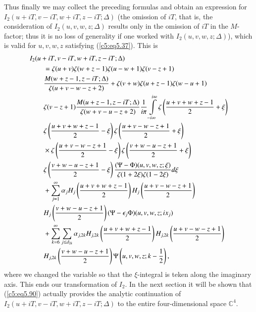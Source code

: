 Thus finally we may collect the preceding formulas and obtain an
expression for $I_2 (u+iT, v - iT, w + iT, z - iT;\Delta)$ (the
omission of $iT$, that is, the consideration of $I_2 (u,v,w,z;\Delta)$
results only in the omission of $iT$ in the $M$-factor; thus it is no
loss of generality if one worked with $I_2 (u,v,w,z;\Delta)$), which
is valid for $u,v,w,z$ satisfying (\ref{c5:eq5.37}). This is 
{\fontsize{10pt}{12pt}\selectfont
\begin{align}
&  I_2 (u+ iT, v - iT, w + iT, z - iT;\Delta)\label{c5:eq5.90}\\
& \qquad = \zeta(u+v) \zeta(w+z-1) \zeta (u-w+1) \zeta(v-z+1)\notag\\
& \qquad  \frac{M(w+z-1,z-iT;\Delta)}{\zeta(u+v-w-z+2)}
 + \zeta (v+w) \zeta(u+z-1) \zeta(w-u+1) \notag\\
& \qquad \zeta(v-z+1) \frac{M(u+z-1, z-iT;\Delta)}{\zeta (w+v-u-z+2)}
 \frac{1}{i\pi}
  \int\limits^{i\infty}_{-i\infty} \zeta \left(\frac{u+v+w+z-1}{2} +
  \xi \right)\notag\\
& \qquad  \zeta \left(\frac{u+v+w+z-1}{2} - \xi \right) \zeta \left(\frac{u+v-w-z+1}{2} + \xi \right)\notag\\
& \qquad\times \zeta \left(\frac{u+v-w-z+1}{2} - \xi \right) \zeta
  \left(\frac{v+w-u-z+1}{2} + \xi \right)\notag\\ 
& \qquad \zeta \left(\frac{v+w-u-z+1}{2} - \xi \right)
  \frac{(\Psi-\Phi) (u,v,w,z;\xi)}{\zeta(1+2\xi) \zeta (1-2\xi)} d
  \xi\notag\\ 
& \qquad  +  \sum\limits^\infty_{j=1} \alpha_j H_j
  \left(\frac{u+v+w+z-1}{2} \right) H_j \left(\frac{u+v-w-z+1}{2}
  \right)\notag\\ 
& \qquad H_j \left(\frac{v+w-u-z+1}{2} \right) (\Psi - \epsilon_j
  \Phi) (u,v,w,z;i x_j)\notag\\ 
& \qquad  + \sum\limits^\infty_{k=6} \sum\limits_{j \leq d_{2k}}
  \alpha_{j,2k} H_{j,2k} \left(\frac{u+v+w+z-1}{2} \right) H_{j,2k}
  \left(\frac{u+v-w-z+1}{2} \right)\notag\\ 
& \qquad   H_{j,2k} \left(\frac{v+w-u-z+1}{2} \right) \Psi
  \left(u,v,w,z;k - \frac{1}{2} \right),\notag 
\end{align}}\pageoriginale
where we changed the variable so that the $\xi$-integral is teken
along the imaginary axis. This ends our transformation of $I_2$. In
the next section it will be shown that (\ref{c5:eq5.90}) actually
provides the analytic continuation of $I_2 (u+iT, v-iT, w+iT,
z-iT;\Delta)$ to the entire four-dimensional space $\mathbb{C}^4$.  

